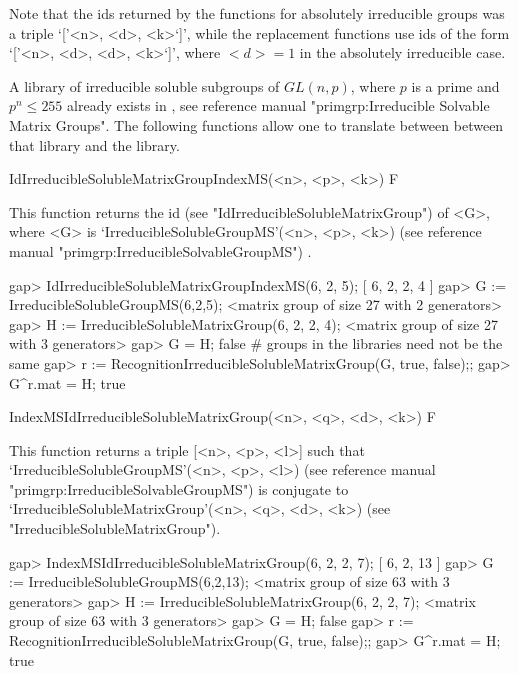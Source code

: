 Note that the ids returned by the functions for absolutely irreducible groups was a triple `['<n>, <d>, <k>`]', while the replacement functions use ids of the form `['<n>, <d>, <d>, <k>`]', where $<d> = 1$ in the absolutely irreducible case.


\null


A library of irreducible soluble subgroups of $GL(n, p)$, where $p$ is a 
prime and $p^n \leq 255$ already exists in {\GAP}, see {\PrimGrp} reference manual "primgrp:Irreducible Solvable Matrix Groups". The following functions
allow one to translate between between that library and the {\IRREDSOL} library. 


\>IdIrreducibleSolubleMatrixGroupIndexMS(<n>, <p>, <k>) F

This function returns the id (see "IdIrreducibleSolubleMatrixGroup") of <G>, 
where <G> is `IrreducibleSolubleGroupMS'(<n>, <p>, <k>) (see {\PrimGrp} reference manual "primgrp:IrreducibleSolvableGroupMS") .

\beginexample
gap> IdIrreducibleSolubleMatrixGroupIndexMS(6, 2, 5);
[ 6, 2, 2, 4 ]
gap> G := IrreducibleSolubleGroupMS(6,2,5);
<matrix group of size 27 with 2 generators>
gap> H := IrreducibleSolubleMatrixGroup(6, 2, 2, 4);
<matrix group of size 27 with 3 generators>
gap> G = H;
false 
# groups in the libraries need not be the same
gap> r := RecognitionIrreducibleSolubleMatrixGroup(G, true, false);;
gap> G^r.mat = H;
true
\endexample

\>IndexMSIdIrreducibleSolubleMatrixGroup(<n>, <q>, <d>, <k>) F

This function returns a triple [<n>, <p>, <l>] such that
`IrreducibleSolubleGroupMS'(<n>, <p>, <l>) (see {\PrimGrp} reference manual "primgrp:IrreducibleSolvableGroupMS") is conjugate to
`IrreducibleSolubleMatrixGroup'(<n>, <q>, <d>, <k>) (see "IrreducibleSolubleMatrixGroup").

\beginexample
gap> IndexMSIdIrreducibleSolubleMatrixGroup(6, 2, 2, 7);
[ 6, 2, 13 ]
gap> G := IrreducibleSolubleGroupMS(6,2,13);
<matrix group of size 63 with 3 generators>
gap> H := IrreducibleSolubleMatrixGroup(6, 2, 2, 7);
<matrix group of size 63 with 3 generators>
gap> G = H;
false 
gap> r := RecognitionIrreducibleSolubleMatrixGroup(G, true, false);;
gap> G^r.mat = H;
true
\endexample


\null


